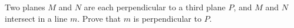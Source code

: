 Two planes $M$ and $N$ are each perpendicular to a third plane $P$, and $M$ and $N$ intersect in a line $m$. Prove that $m$ is perpendicular to $P$.
